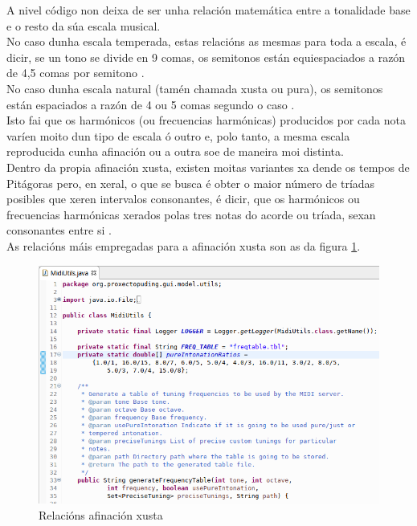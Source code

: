    A nivel código non deixa de ser unha relación matemática entre a tonalidade
   base e o resto da súa escala musical. \\
   
   No caso dunha escala temperada, estas relacións as mesmas para toda a escala,
   é dicir, se un tono se divide en 9 comas, os semitonos están equiespaciados a
   razón de 4,5 comas por semitono \cite{AfinacionTemperada}. \\
   
   No caso dunha escala natural (tamén chamada xusta ou pura), os semitonos
   están espaciados a razón de 4 ou 5 comas segundo o caso
   \cite{AfinacionNatural}. \\
   
   Isto fai que os harmónicos (ou frecuencias harmónicas) producidos por cada
   nota varíen moito dun tipo de escala ó outro e, polo tanto, a mesma escala
   reproducida cunha afinación ou a outra soe de maneira moi distinta. \\
   
   Dentro da propia afinación xusta, existen moitas variantes xa dende os tempos
   de Pitágoras pero, en xeral, o que se busca é obter o maior número de tríadas
   posibles que xeren intervalos consonantes, é dicir, que os harmónicos ou
   frecuencias harmónicas xerados polas tres notas do acorde ou tríada, sexan
   consonantes entre si \cite{Escalas}. \\
   
   As relacións máis empregadas para a afinación xusta son as da figura
   \ref{figura:AfinacionNatural}. \\
   
   \begin{figure}[htbp]
    \centering
    \includegraphics[scale=0.6, keepaspectratio=true]{./imagenes/afinacion-natural.png}
    \caption{Relacións afinación xusta}
    \label{figura:AfinacionNatural}
   \end{figure}
   
